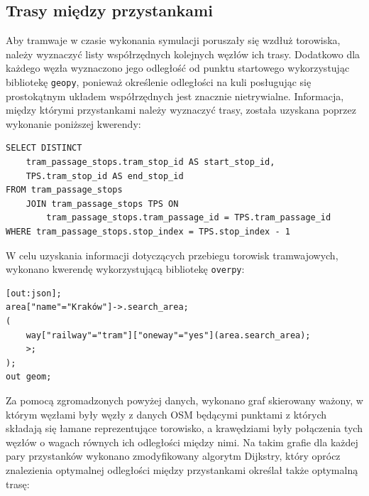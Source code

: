 \documentclass[12pt,a4paper]{article}
\begin{document}
        \subsection{Trasy między przystankami}
            Aby tramwaje w czasie wykonania symulacji poruszały się wzdłuż torowiska, należy wyznaczyć listy współrzędnych kolejnych węzłów ich trasy. Dodatkowo dla każdego węzła wyznaczono jego odległość od punktu startowego wykorzystując bibliotekę \texttt{geopy}\cite{geopy}, ponieważ określenie odległości na kuli posługując się prostokątnym układem współrzędnych jest znacznie nietrywialne. Informacja, między którymi przystankami należy wyznaczyć trasy, została uzyskana poprzez wykonanie poniższej kwerendy:

\begin{verbatim}
SELECT DISTINCT
    tram_passage_stops.tram_stop_id AS start_stop_id,
    TPS.tram_stop_id AS end_stop_id
FROM tram_passage_stops
    JOIN tram_passage_stops TPS ON
        tram_passage_stops.tram_passage_id = TPS.tram_passage_id
WHERE tram_passage_stops.stop_index = TPS.stop_index - 1
\end{verbatim}

            W celu uzyskania informacji dotyczących przebiegu torowisk tramwajowych, wykonano kwerendę wykorzystującą bibliotekę \texttt{overpy}:

\begin{verbatim}
[out:json];
area["name"="Kraków"]->.search_area;
(
    way["railway"="tram"]["oneway"="yes"](area.search_area);
    >;
);
out geom;
\end{verbatim}

            Za pomocą zgromadzonych powyżej danych, wykonano graf skierowany ważony, w którym węzłami były węzły z danych OSM będącymi punktami z których składają się łamane reprezentujące torowisko, a krawędziami były połączenia tych węzłów o wagach równych ich odległości między nimi. Na takim grafie dla każdej pary przystanków wykonano zmodyfikowany algorytm Dijkstry, który oprócz znalezienia optymalnej odległości między przystankami określał także optymalną trasę:
\end{document}
